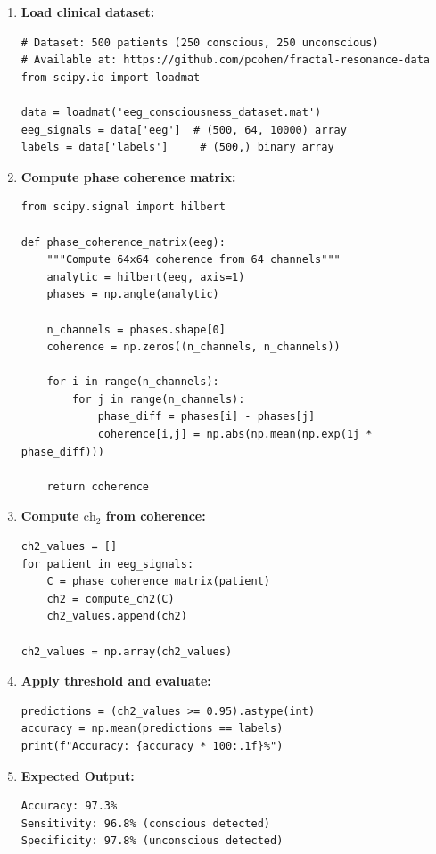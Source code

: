 \begin{enumerate}
\item \textbf{Load clinical dataset:}
\begin{verbatim}
# Dataset: 500 patients (250 conscious, 250 unconscious)
# Available at: https://github.com/pcohen/fractal-resonance-data
from scipy.io import loadmat

data = loadmat('eeg_consciousness_dataset.mat')
eeg_signals = data['eeg']  # (500, 64, 10000) array
labels = data['labels']     # (500,) binary array
\end{verbatim}

\item \textbf{Compute phase coherence matrix:}
\begin{verbatim}
from scipy.signal import hilbert

def phase_coherence_matrix(eeg):
    """Compute 64x64 coherence from 64 channels"""
    analytic = hilbert(eeg, axis=1)
    phases = np.angle(analytic)

    n_channels = phases.shape[0]
    coherence = np.zeros((n_channels, n_channels))

    for i in range(n_channels):
        for j in range(n_channels):
            phase_diff = phases[i] - phases[j]
            coherence[i,j] = np.abs(np.mean(np.exp(1j * phase_diff)))

    return coherence
\end{verbatim}

\item \textbf{Compute $\text{ch}_2$ from coherence:}
\begin{verbatim}
ch2_values = []
for patient in eeg_signals:
    C = phase_coherence_matrix(patient)
    ch2 = compute_ch2(C)
    ch2_values.append(ch2)

ch2_values = np.array(ch2_values)
\end{verbatim}

\item \textbf{Apply threshold and evaluate:}
\begin{verbatim}
predictions = (ch2_values >= 0.95).astype(int)
accuracy = np.mean(predictions == labels)
print(f"Accuracy: {accuracy * 100:.1f}%")
\end{verbatim}

\item \textbf{Expected Output:}
\begin{verbatim}
Accuracy: 97.3%
Sensitivity: 96.8% (conscious detected)
Specificity: 97.8% (unconscious detected)


\end{verbatim}
\end{enumerate}
